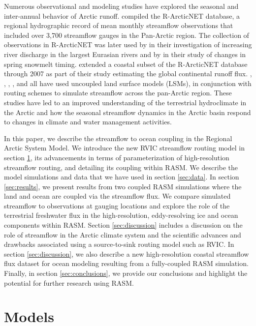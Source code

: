 \documentclass[jgrga, draft]{agutex}
\begin{document}
\begin{article}
Numerous observational and modeling studies have explored the seasonal and inter-annual behavior of Arctic runoff.
\citet{Lammers_2001} compiled the R-ArcticNET database, a regional hydrographic record of mean monthly streamflow observations that included over 3,700 streamflow gauges in the Pan-Arctic region.
The collection of observations in R-ArcticNET was later used by \citet{Shiklomanov_2009} in their investigation of increasing river discharge in the largest Eurasian rivers and by \citet{Tan_2011} in their study of changes in spring snowmelt timing.
\citet{Dai_2009} extended a coastal subset of the R-ArcticNET database through 2007 as part of their study estimating the global continental runoff flux.
\citet{Su_2005}, \citet{Adam_2007}, \citet{Slater_2007}, \citet{Adam_2008}, and \citet{Dai_2009} all have used uncoupled land surface models (LSMs), in conjunction with routing schemes to simulate streamflow across the pan-Arctic region.
These studies have led to an improved understanding of the terrestrial hydroclimate in the Arctic and how the seasonal streamflow dynamics in the Arctic basin respond to changes in climate and water management activities.

In this paper, we describe the streamflow to ocean coupling in the Regional Arctic System Model.
We introduce the new RVIC streamflow routing model in section \ref{sec:models}, its advancements in terms of parameterization of high-resolution streamflow routing, and detailing its coupling within RASM.
We describe the model simulations and data that we have used in section \ref{sec:data}.
In section \ref{sec:results}, we present results from two coupled RASM simulations where the land and ocean are coupled via the streamflow flux.
We compare simulated streamflow to observations at gauging locations and explore the role of the terrestrial freshwater flux in the high-resolution, eddy-resolving ice and ocean components within RASM.
Section \ref{sec:discussion} includes a discussion on the role of streamflow in the Arctic climate system and the scientific advances and drawbacks associated using a source-to-sink routing model such as RVIC.
In section \ref{sec:discussion}, we also describe a new high-resolution coastal streamflow flux dataset for ocean modeling resulting from a fully-coupled RASM simulation.
Finally, in section \ref{sec:conclusions}, we provide our conclusions and highlight the potential for further research using RASM.

\section{Models}
\label{sec:models}


\end{article}
\end{document}
